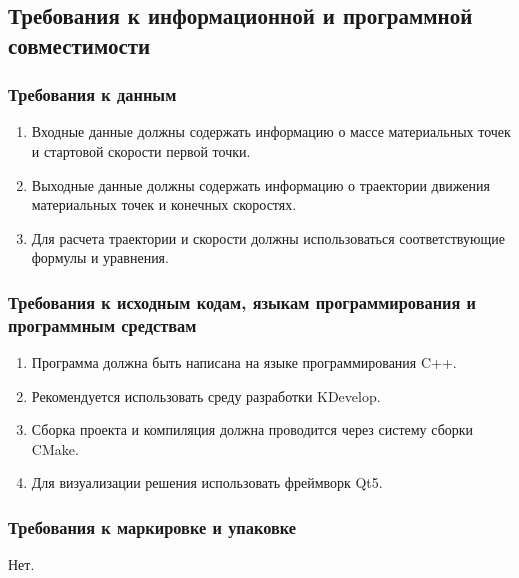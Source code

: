  \subsection{Требования к информационной и программной совместимости}
 \subsubsection{Требования к данным}
 \begin{enumerate}
  \item Входные данные должны содержать информацию о массе материальных точек и стартовой скорости первой точки.
  \item Выходные данные должны содержать информацию о траектории движения материальных точек и конечных скоростях.
  \item Для расчета траектории и скорости должны использоваться соответствующие формулы и уравнения.
 \end{enumerate}

 \subsubsection{ Требования к исходным кодам, языкам программирования и программным средствам}
 \begin{enumerate}
  \item Программа должна быть написана на языке программирования C++.
  \item Рекомендуется использовать среду разработки KDevelop.
  \item Сборка проекта и компиляция должна проводится через систему сборки CMake.
  \item Для визуализации решения использовать фреймворк Qt5.
 \end{enumerate}

 \subsubsection{Требования к маркировке и упаковке}
 Нет.

